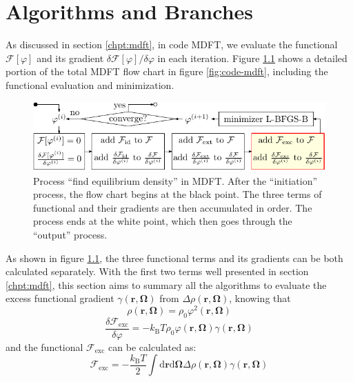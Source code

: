 
\chapter{Algorithms and Branches\label{chpt:algorithms-and-branches}}

As discussed in section \ref{chpt:mdft}, in code MDFT, we evaluate
the functional $\mathcal{F}[\varphi]$ and its gradient $\delta\mathcal{F}[\varphi]/\delta\varphi$
in each iteration. Figure \ref{fig:find-eq-den} shows a detailed
portion of the total MDFT flow chart in figure \ref{fig:code-mdft},
including the functional evaluation and minimization.

\begin{figure}[h]
\begin{centering}
\includegraphics{_figure/find_equilibium_density}
\par\end{centering}
\caption[Process ``find equilibrium density'' in MDFT]{Process ``find equilibrium density'' in MDFT. After the ``initiation''
process, the flow chart begins at the black point. The three terms
of functional and their gradients are then accumulated in order. The
process ends at the white point, which then goes through the ``output''
process. \label{fig:find-eq-den}}
\end{figure}

As shown in figure \ref{fig:find-eq-den}, the three functional terms
and its gradients can be both calculated separately. With the first
two terms well presented in section \ref{chpt:mdft}, this section
aims to summary all the algorithms to evaluate the excess functional
gradient $\gamma(\mathbf{r},\mathbf{\Omega})$ from $\Delta\rho(\mathbf{r},\mathbf{\Omega})$,
knowing that
\begin{equation}
\rho(\mathbf{r},\mathbf{\Omega})=\rho_{0}\varphi^{2}(\mathbf{r},\mathbf{\Omega})
\end{equation}
\begin{equation}
\frac{\delta\mathcal{F}_{\mathrm{exc}}}{\delta\varphi}=-k_{\mathrm{B}}T\rho_{0}\varphi(\mathbf{r},\mathbf{\Omega})\gamma(\mathbf{r},\mathbf{\Omega})
\end{equation}
and the functional $\mathcal{F}_{\mathrm{exc}}$ can be calculated
as:
\begin{equation}
\mathcal{F}_{\mathrm{exc}}=-\frac{k_{\mathrm{B}}T}{2}\int\mathrm{d}\mathbf{r}\mathrm{d}\mathbf{\Omega}\Delta\rho(\mathbf{r},\mathbf{\Omega})\gamma(\mathbf{r},\mathbf{\Omega})
\end{equation}


